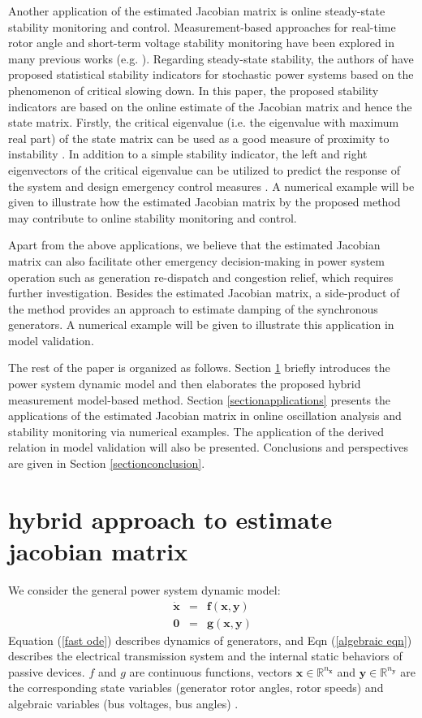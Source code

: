 \documentclass[journal]{IEEEtran}
\begin{document}
Another application of the estimated Jacobian matrix is online steady-state stability monitoring and control. Measurement-based approaches for real-time rotor angle and short-term voltage stability monitoring have been explored in many previous works (e.g. \cite{CCLiu:2011}\cite{Ajjarapu:2013}). Regarding steady-state stability, the authors of \cite{Hines:2015}\cite{Hines:2014} have proposed statistical stability indicators for stochastic power systems based on the phenomenon of critical slowing down. In this paper, the proposed stability indicators are based on the online estimate of the Jacobian matrix and hence the state matrix. Firstly, the critical eigenvalue (i.e. the eigenvalue with maximum real part) of the state matrix can be used as a good measure of proximity to instability \cite{Kundur:1992}. In addition to a simple stability indicator, the left and right eigenvectors of the critical eigenvalue can be utilized to predict the response of the system and design emergency control measures \cite{Hill:1993}\cite{Cutsem:book}. A numerical example will be given to illustrate how the estimated Jacobian matrix by the proposed method may contribute to online stability monitoring and control.


Apart from the above applications, we believe that the estimated Jacobian matrix can also facilitate other emergency decision-making in power system operation such as generation re-dispatch and congestion relief, which requires further investigation. Besides the estimated Jacobian matrix, a side-product of the method provides an approach to estimate damping of the synchronous generators. A numerical example will be given to illustrate this application in model validation.

The rest of the paper is organized as follows. Section \ref{sectionmodel} briefly introduces the power system dynamic model and then elaborates the proposed hybrid measurement model-based method. Section \ref{sectionapplications} presents the applications of the estimated Jacobian matrix in online oscillation analysis and stability monitoring via numerical examples. The application of the derived relation in model validation will also be presented. Conclusions and perspectives are given in Section \ref{sectionconclusion}.

\section{hybrid approach to estimate jacobian matrix}\label{sectionmodel}
We consider the general power system dynamic model: \begin{eqnarray}
\dot{\bm{x}}&=&\bm{f}({\bm{x},\bm{y}})\label{fast ode}\\\bm{0}&=&\bm{g}({\bm{x},\bm{y}})\label{algebraic eqn}
\end{eqnarray}
Equation (\ref{fast ode}) describes dynamics of generators, and Eqn (\ref{algebraic eqn}) describes the electrical transmission system and the internal static behaviors of passive devices. $f$ and $g$ are continuous functions, vectors $\bm{x}\in\mathbb{R}^{n_{\bm{x}}}$ and $\bm{y}\in\mathbb{R}^{n_{\bm{y}}}$ are the corresponding state variables (generator rotor angles, rotor speeds) and algebraic variables (bus voltages, bus angles) \cite{Wangxz:CAS}.
\end{document}
